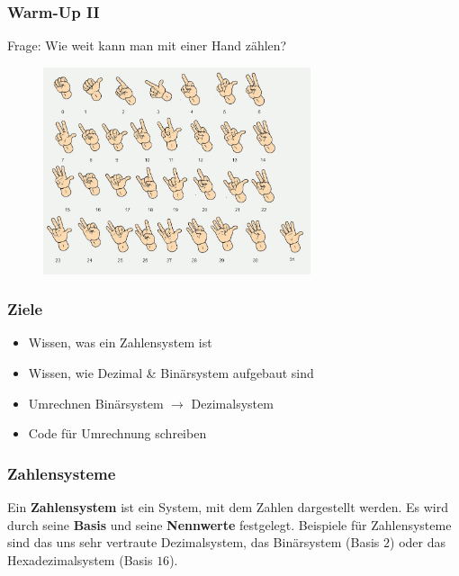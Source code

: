 \documentclass{beamer}
\begin{document}
\begin{frame}
    \frametitle{Warm-Up II}
    Frage: Wie weit kann man mit einer Hand zählen?
    \begin{figure}[H]
        \centering
        \includegraphics[width=0.7\textwidth]{binarycount}
    \end{figure}
\end{frame}

\begin{frame}
    \frametitle{Ziele}
    \begin{itemize}
        \item Wissen, was ein Zahlensystem ist
        \item {} Wissen, wie Dezimal \& Binärsystem aufgebaut sind
        \item {} Umrechnen Binärsystem $\rightarrow$ Dezimalsystem
        \item {} Code für Umrechnung schreiben
    \end{itemize}
\end{frame}

\begin{frame}
    \frametitle{Zahlensysteme}    
    \begin{definition}
        Ein \textbf{Zahlensystem} ist ein System, mit dem Zahlen dargestellt werden. Es wird durch seine \textbf{Basis} und seine \textbf{Nennwerte} festgelegt.
        \linebreak
        \linebreak
        Beispiele für Zahlensysteme sind das uns sehr vertraute Dezimalsystem, das Binärsystem (Basis $2$) oder das Hexadezimalsystem (Basis $16$).
    \end{definition}
\end{frame}
\end{document}

